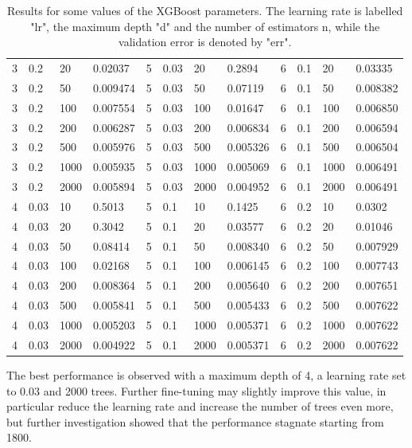\begin{table}[h!]
\begin{tabular}{|l|l|l|l||l|l|l|l||l|l|l|l|}
        3 & 0.2  & 20   & 0.02037  &  5 & 0.03 & 20   & 0.2894   & 6 & 0.1  & 20   & 0.03335  \\
        3 & 0.2  & 50   & 0.009474 &  5 & 0.03 & 50   & 0.07119  & 6 & 0.1  & 50   & 0.008382 \\
        3 & 0.2  & 100  & 0.007554 &  5 & 0.03 & 100  & 0.01647  & 6 & 0.1  & 100  & 0.006850 \\
        3 & 0.2  & 200  & 0.006287 &  5 & 0.03 & 200  & 0.006834 & 6 & 0.1  & 200  & 0.006594 \\
        3 & 0.2  & 500  & 0.005976 &  5 & 0.03 & 500  & 0.005326 & 6 & 0.1  & 500  & 0.006504 \\
        3 & 0.2  & 1000 & 0.005935 &  5 & 0.03 & 1000 & 0.005069 & 6 & 0.1  & 1000 & 0.006491 \\
        3 & 0.2  & 2000 & 0.005894 &  5 & 0.03 & 2000 & 0.004952 & 6 & 0.1  & 2000 & 0.006491 \\
        4 & 0.03 & 10   & 0.5013   &  5 & 0.1  & 10   & 0.1425   & 6 & 0.2  & 10   & 0.0302   \\
        4 & 0.03 & 20   & 0.3042   &  5 & 0.1  & 20   & 0.03577  & 6 & 0.2  & 20   & 0.01046  \\
        4 & 0.03 & 50   & 0.08414  &  5 & 0.1  & 50   & 0.008340 & 6 & 0.2  & 50   & 0.007929 \\
        4 & 0.03 & 100  & 0.02168  &  5 & 0.1  & 100  & 0.006145 & 6 & 0.2  & 100  & 0.007743 \\
        4 & 0.03 & 200  & 0.008364 &  5 & 0.1  & 200  & 0.005640 & 6 & 0.2  & 200  & 0.007651 \\
        4 & 0.03 & 500  & 0.005841 &  5 & 0.1  & 500  & 0.005433 & 6 & 0.2  & 500  & 0.007622 \\
        4 & 0.03 & 1000 & 0.005203 &  5 & 0.1  & 1000 & 0.005371 & 6 & 0.2  & 1000 & 0.007622 \\
        4 & 0.03 & 2000 & 0.004922 &  5 & 0.1  & 2000 & 0.005371 & 6 & 0.2  & 2000 & 0.007622 \\ \hline
    \end{tabular}
    \caption{Results for some values of the XGBoost parameters. The learning rate is labelled "lr", the maximum depth "d" and the number of estimators n, while the validation error is denoted by "err".}
    \label{tab:results-xgboost}
\end{table}

The best performance is observed with a maximum depth of 4, a learning rate set to 0.03 and 2000 trees. Further fine-tuning may slightly improve this value, in particular reduce the learning rate and increase the number of trees even more, but further investigation showed that the performance stagnate starting from 1800.

